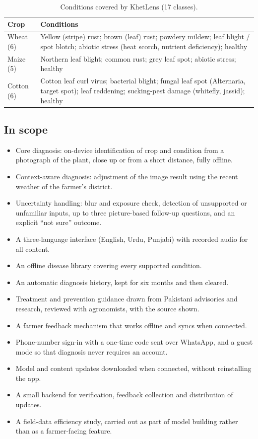 \begin{table}[H]
\centering\small
\caption{Conditions covered by KhetLens (17 classes).}
\label{tab:classes}
\begin{tabularx}{\textwidth}{|L{1.8cm}|Y|}
\hline
\textbf{Crop} & \textbf{Conditions} \\ \hline
Wheat (6) & Yellow (stripe) rust; brown (leaf) rust; powdery mildew; leaf blight / spot blotch; abiotic stress (heat scorch, nutrient deficiency); healthy \\ \hline
Maize (5) & Northern leaf blight; common rust; grey leaf spot; abiotic stress; healthy \\ \hline
Cotton (6) & Cotton leaf curl virus; bacterial blight; fungal leaf spot (Alternaria, target spot); leaf reddening; sucking-pest damage (whitefly, jassid); healthy \\ \hline
\end{tabularx}
\end{table}

\subsection{In scope}
\begin{itemize}
  \item Core diagnosis: on-device identification of crop and condition from a photograph of the plant, close up or from a short distance, fully offline.
  \item Context-aware diagnosis: adjustment of the image result using the recent weather of the farmer's district.
  \item Uncertainty handling: blur and exposure check, detection of unsupported or unfamiliar inputs, up to three picture-based follow-up questions, and an explicit ``not sure'' outcome.
  \item A three-language interface (English, Urdu, Punjabi) with recorded audio for all content.
  \item An offline disease library covering every supported condition.
  \item An automatic diagnosis history, kept for six months and then cleared.
  \item Treatment and prevention guidance drawn from Pakistani advisories and research, reviewed with agronomists, with the source shown.
  \item A farmer feedback mechanism that works offline and syncs when connected.
  \item Phone-number sign-in with a one-time code sent over WhatsApp, and a guest mode so that diagnosis never requires an account.
  \item Model and content updates downloaded when connected, without reinstalling the app.
  \item A small backend for verification, feedback collection and distribution of updates.
  \item A field-data efficiency study, carried out as part of model building rather than as a farmer-facing feature.
\end{itemize}

